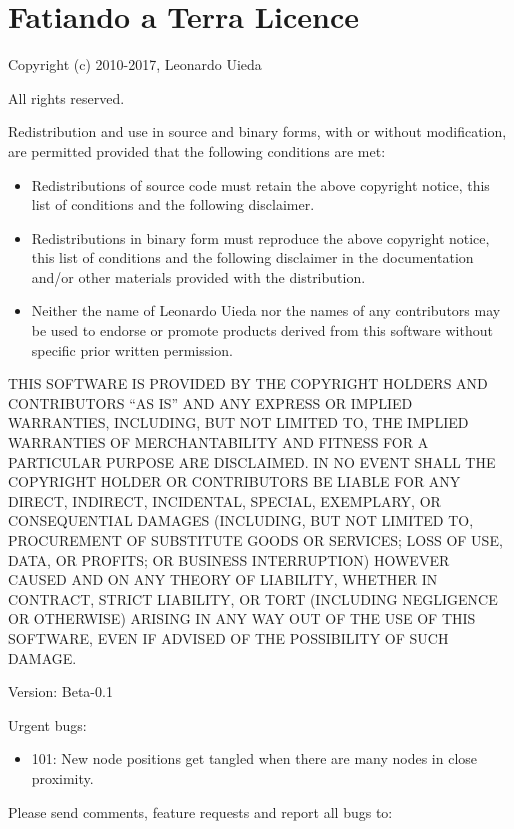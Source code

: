\documentclass[a4paper,12pt,english]{sphinxmanual}
\begin{document}
\section{Fatiando a Terra Licence}
\label{\detokenize{licence:fatiando-a-terra-licence}}
Copyright (c) 2010-2017, Leonardo Uieda

All rights reserved.

Redistribution and use in source and binary forms, with or without modification,
are permitted provided that the following conditions are met:
\begin{itemize}
\item {} 
Redistributions of source code must retain the above copyright notice,
this list of conditions and the following disclaimer.

\item {} 
Redistributions in binary form must reproduce the above copyright notice,
this list of conditions and the following disclaimer in the documentation
and/or other materials provided with the distribution.

\item {} 
Neither the name of Leonardo Uieda nor the names of any contributors
may be used to endorse or promote products derived from this software
without specific prior written permission.

\end{itemize}

THIS SOFTWARE IS PROVIDED BY THE COPYRIGHT HOLDERS AND CONTRIBUTORS “AS IS” AND
ANY EXPRESS OR IMPLIED WARRANTIES, INCLUDING, BUT NOT LIMITED TO, THE IMPLIED
WARRANTIES OF MERCHANTABILITY AND FITNESS FOR A PARTICULAR PURPOSE ARE
DISCLAIMED. IN NO EVENT SHALL THE COPYRIGHT HOLDER OR CONTRIBUTORS BE LIABLE FOR
ANY DIRECT, INDIRECT, INCIDENTAL, SPECIAL, EXEMPLARY, OR CONSEQUENTIAL DAMAGES
(INCLUDING, BUT NOT LIMITED TO, PROCUREMENT OF SUBSTITUTE GOODS OR SERVICES;
LOSS OF USE, DATA, OR PROFITS; OR BUSINESS INTERRUPTION) HOWEVER CAUSED AND ON
ANY THEORY OF LIABILITY, WHETHER IN CONTRACT, STRICT LIABILITY, OR TORT
(INCLUDING NEGLIGENCE OR OTHERWISE) ARISING IN ANY WAY OUT OF THE USE OF THIS
SOFTWARE, EVEN IF ADVISED OF THE POSSIBILITY OF SUCH DAMAGE.



Version: Beta-0.1

Urgent bugs:
\begin{itemize}
\item {} 
101: New node positions get tangled when there are many nodes in close proximity.

\end{itemize}

Please send comments, feature requests and report all bugs to: 



\renewcommand{\indexname}{Index}
\printindex
\end{document}
